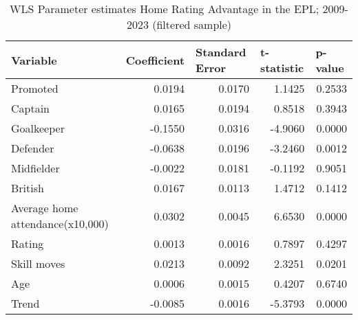 \begin{table}[htbp]
    \begin{spacing}{1.5}
    \small
    \centering
    \caption{WLS Parameter estimates Home Rating Advantage in the EPL; 2009-2023 (filtered sample)}
    \label{tab:wls_parameter_estimates_hra_filtered_sample}
    \begin{tabular}{lrrrr}
        \toprule
        \toprule
        Variable & \multicolumn{1}{l}{Coefficient} & \multicolumn{1}{l}{Standard Error} & \multicolumn{1}{l}{t-statistic} & \multicolumn{1}{l}{p-value} \\
        \midrule
        Promoted & 0.0194 & 0.0170 & 1.1425 & 0.2533 \\
        Captain & 0.0165 & 0.0194 & 0.8518 & 0.3943 \\
        Goalkeeper & -0.1550 & 0.0316 & -4.9060 & 0.0000 \\
        Defender & -0.0638 & 0.0196 & -3.2460 & 0.0012 \\
        Midfielder & -0.0022 & 0.0181 & -0.1192 & 0.9051 \\
        British & 0.0167 & 0.0113 & 1.4712 & 0.1412 \\
        Average home attendance(x10,000) & 0.0302 & 0.0045 & 6.6530 & 0.0000 \\
        Rating & 0.0013 & 0.0016 & 0.7897 & 0.4297 \\
        Skill moves & 0.0213 & 0.0092 & 2.3251 & 0.0201 \\
        Age   & 0.0006 & 0.0015 & 0.4207 & 0.6740 \\
        Trend & -0.0085 & 0.0016 & -5.3793 & 0.0000 \\
        \bottomrule
        \bottomrule
    \end{tabular}
    \end{spacing}
\end{table}%